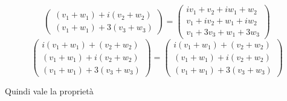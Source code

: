 \documentclass[a4paper]{article}
\theoremstyle{break}
\theoremstyle{break}
\theoremstyle{break}
\theoremstyle{break}
\begin{document}
\begin{enumerate}
\begin{itemize}
\[\begin{pmatrix}
				            (v_1 + w_1) + i(v_2 + w_2) \\
				            (v_1 + w_1) + 3(v_3 + w_3)
			            \end{pmatrix}
			            =
			            \begin{pmatrix}
				            iv_1 + v_2 + iw_1 + w_2 \\
				            v_1 + iv_2 + w_1 + iw_2 \\
				            v_1 + 3v_3 + w_1 + 3w_3
			            \end{pmatrix}
		            \]
		            \[
			            \begin{pmatrix}
				            i(v_1 + w_1) + (v_2 + w_2) \\
				            (v_1 + w_1) + i(v_2 + w_2) \\
				            (v_1 + w_1) + 3(v_3 + w_3)
			            \end{pmatrix}
			            =
			            \begin{pmatrix}
				            i(v_1 + w_1) + (v_2 + w_2) \\
				            (v_1 + w_1) + i(v_2 + w_2) \\
				            (v_1 + w_1) + 3(v_3 + w_3)
			            \end{pmatrix}
		            \]
		            \begin{center}
			            Quindi vale la proprietà
		            \end{center}


\end{itemize}
\end{enumerate}
\end{document}
